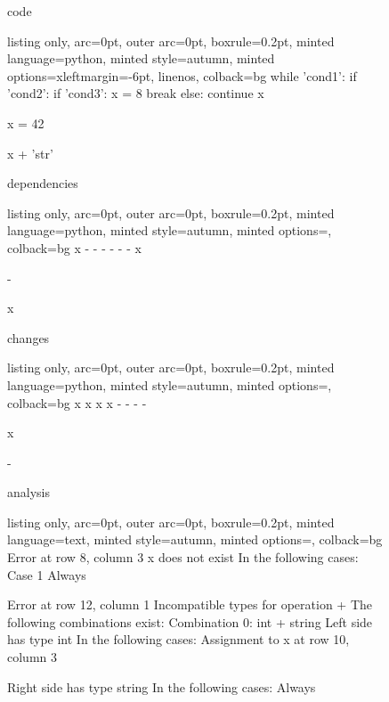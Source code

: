 \begin{figure}[!h]
 \begin{minipage}{0.32\textwidth}
 code
  \begin{tcblisting}{listing only, 
    arc=0pt,
    outer arc=0pt, 
    boxrule=0.2pt,
    minted language=python,
    minted style=autumn,
    minted options={xleftmargin=-6pt, linenos},
    colback=bg }
while 'cond1':
  if 'cond2':
    if 'cond3':
      x = 8
      break
    else:
      continue
  x

  x = 42

x + 'str'
\end{tcblisting}
 \end{minipage}
 \begin{minipage}{0.32\textwidth}
 dependencies
  \begin{tcblisting}{listing only, 
    arc=0pt,
    outer arc=0pt, 
    boxrule=0.2pt,
    minted language=python,
    minted style=autumn,
    minted options={},
    colback=bg }
x
-
-
-
-
-
-
x

-

x
\end{tcblisting}
 \end{minipage}
 \begin{minipage}{0.32\textwidth}
 changes
  \begin{tcblisting}{listing only, 
    arc=0pt,
    outer arc=0pt, 
    boxrule=0.2pt,
    minted language=python,
    minted style=autumn,
    minted options={},
    colback=bg }
x
x
x
x
-
-
-
-

x

-
\end{tcblisting}
 \end{minipage}
 \begin{minipage}{\textwidth}
 \vspace{4pt}
 analysis
  \begin{tcblisting}{listing only, 
    arc=0pt,
    outer arc=0pt, 
    boxrule=0.2pt,
    minted language=text,
    minted style=autumn,
    minted options={},
    colback=bg }
Error at row 8, column 3
  x does not exist
  In the following cases:
  Case 1
    Always

Error at row 12, column 1
  Incompatible types for operation +
  The following combinations exist:
  Combination 0: int + string
    Left side has type int
    In the following cases:
      Assignment to x at row 10, column 3

    Right side has type string
    In the following cases:
      Always


\end{tcblisting}
 \end{minipage}
 \label{lst:break2}
\end{figure}